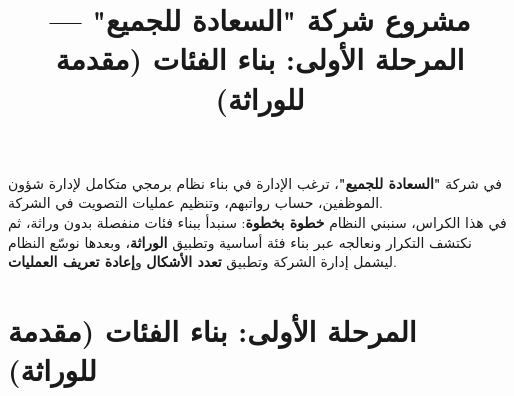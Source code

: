 \documentclass[14pt]{extarticle}
\title{مشروع شركة "السعادة للجميع" — المرحلة الأولى: بناء الفئات (مقدمة للوراثة)}
\begin{document}
\maketitle
\thispagestyle{fancy}

\begin{boxDef}
في شركة \textbf{"السعادة للجميع"}، ترغب الإدارة في بناء نظام برمجي متكامل لإدارة شؤون الموظفين، حساب رواتبهم، وتنظيم عمليات التصويت في الشركة. \\
في هذا الكراس، سنبني النظام \textbf{خطوة بخطوة}: سنبدأ ببناء فئات منفصلة بدون وراثة، ثم نكتشف التكرار ونعالجه عبر بناء فئة أساسية وتطبيق \textbf{الوراثة}، وبعدها نوسّع النظام ليشمل إدارة الشركة وتطبيق \textbf{تعدد الأشكال} و\textbf{إعادة تعريف العمليات}.
\end{boxDef}

\section*{المرحلة الأولى: بناء الفئات (مقدمة للوراثة)}
\end{document}
